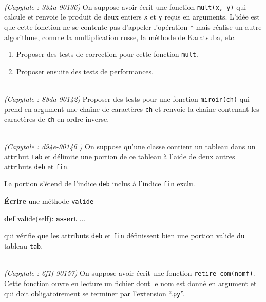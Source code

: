 \documentclass[a4paper,17pt]{extarticle}
\newenvironment{eleve}%
{\begin{activite}\color{noiramu}\\[-0.5cm]}
{\end{activite}}
\providecommand{\tightlist}{%
      \setlength{\itemsep}{0pt}\setlength{\parskip}{0pt}}
\newenvironment{Shaded}{}{}
\newcommand{\KeywordTok}[1]{\textcolor[rgb]{0.00,0.44,0.13}{\textbf{{#1}}}}
\newcommand{\NormalTok}[1]{{#1}}
\newcommand{\VariableTok}[1]{\textcolor[rgb]{0.10,0.09,0.49}{{#1}}}
\newcommand{\ControlFlowTok}[1]{\textcolor[rgb]{0.00,0.44,0.13}{\textbf{{#1}}}}
\begin{document}
\begin{eleve}
    \emph{(Capytale : 334a-90136)} On suppose avoir écrit une fonction
\texttt{mult(x,\ y)} qui calcule et renvoie le produit de deux entiers
\texttt{x} et \texttt{y} reçus en arguments. L'idée est que cette
fonction ne se contente pas d'appeler l'opération \texttt{*} mais
réalise un autre algorithme, comme la multiplication russe, la méthode
de Karatsuba, etc.

\begin{enumerate}
\def\labelenumi{\arabic{enumi}.}
\tightlist
\item
  Proposer des tests de correction pour cette fonction \texttt{mult}.
\item
  Proposer ensuite des tests de performances.
\end{enumerate}
        
        \end{eleve}\begin{eleve}
    \emph{(Capytale : 88da-90142)} Proposer des tests pour une fonction
\texttt{miroir(ch)} qui prend en argument une chaîne de caractères
\texttt{ch} et renvoie la chaîne contenant les caractères de \texttt{ch}
en ordre inverse.
        
        \end{eleve}\begin{eleve}
    \emph{(Capytale : d94e-90146 )} On suppose qu'une classe contient un
tableau dans un attribut \texttt{tab} et délimite une portion de ce
tableau à l'aide de deux autres attributs \texttt{deb} et \texttt{fin}.

La portion s'étend de l'indice \texttt{deb} inclus à l'indice
\texttt{fin} exclu.

\textbf{Écrire} une méthode \texttt{valide}

\begin{Shaded}
\begin{Highlighting}[]
\KeywordTok{def}\NormalTok{ valide(}\VariableTok{self}\NormalTok{):}
    \ControlFlowTok{assert}\NormalTok{ ...}
\end{Highlighting}
\end{Shaded}

qui vérifie que les attributs \texttt{deb} et \texttt{fin} définissent
bien une portion valide du tableau \texttt{tab}.
        
        \end{eleve}\begin{eleve}
    \emph{(Capytale : 6f1f-90157)} On suppose avoir écrit une fonction
\texttt{retire\_com(nomf)}. Cette fonction ouvre en lecture un fichier
dont le nom est donné en argument et qui doit obligatoirement se
terminer par l'extension ``.\texttt{py}''.


\end{eleve}
\end{document}
